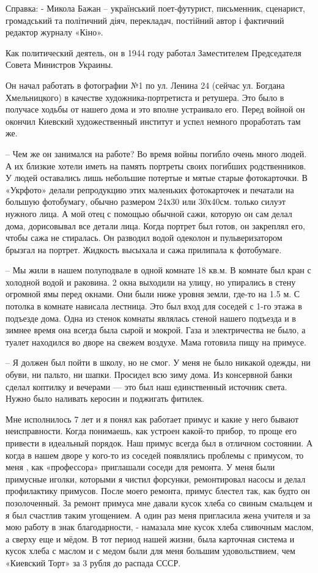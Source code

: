 Справка: - Микола Бажан – український поет-футурист, письменник, сценарист,
громадський та політичний діяч, перекладач, постійний автор і фактичний
редактор журналу «Кіно».

Как политический деятель, он в 1944 году  работал Заместителем Председателя
Совета Министров Украины.

 Он начал работать в фотографии №1 по ул. Ленина 24 (сейчас ул. Богдана
 Хмельницкого) в качестве художника-портретиста и ретушера. Это было в получасе
 ходьбы от нашего дома и это вполне  устраивало его. Перед войной он окончил
 Киевский художественный институт и успел немного проработать там же. 

– Чем же он занимался на работе? Во время войны погибло очень много людей. А их
близкие хотели иметь на память портреты своих погибших родственников. У людей
оставались лишь небольшие потертые и мятые старые фотокарточки.  В «Укрфото»
делали репродукцию этих маленьких фотокарточек и печатали на большую
фотобумагу, обычно размером 24х30 или 30х40см. только силуэт нужного лица. А
мой отец с помощью обычной сажи, которую он сам  делал дома, дорисовывал все
детали лица. Когда портрет был готов, он закреплял его, чтобы сажа не
стиралась. Он разводил водой одеколон и пульверизатором брызгал на портрет.
Жидкость высыхала и сажа прилипала к фотобумаге.

– Мы жили в нашем полуподвале в одной комнате 18 кв.м. В комнате был кран с
холодной водой и раковина. 2 окна выходили на улицу, но упирались в стену
огромной ямы перед окнами. Они были ниже уровня земли, где-то на 1.5 м. С
потолка в комнате нависала лестница. Это был вход для соседей с 1-го этажа в
подъезде дома. Одна из стенок комнаты являлась стеной нашего подъезда и в
зимнее время она всегда была сырой  и  мокрой.  Газа и  электричества не было,
а туалет находился во дворе на свежем воздухе. Мама готовила пищу на примусе.

– Я должен был пойти в школу, но не смог. У меня не было никакой одежды, ни
обуви, ни пальто, ни шапки. Просидел всю зиму дома. Из консервной банки  сделал
коптилку и  вечерами — это был наш единственный источник света.  Нужно было
наливать керосин и поджигать фитилек.

Мне исполнилось 7 лет и я понял как работает примус и какие у него бывают
неисправности. Когда понимаешь, как устроен какой-то прибор, то проще его
привести в идеальный порядок. Наш примус всегда был в отличном состоянии. А
когда в нашем дворе у кого-то из соседей появлялись проблемы с примусом, то
меня , как «профессора» приглашали соседи для ремонта. У меня были примусные
иголки, которыми я чистил форсунки, ремонтировал насосы и делал профилактику
примусов. После моего ремонта, примус блестел так, как будто он позолоченный.
За ремонт примуса мне давали кусок хлеба со свиным смальцем и я был счастлив
таким угощением. А один раз меня пригласила жена учителя и за мою работу в знак
благодарности, - намазала  мне кусок хлеба сливочным маслом, а сверху еще и
мёдом. В тот период нашей  жизни, была карточная система  и кусок хлеба с
маслом и с медом были для меня большим удовольствием, чем «Киевский Торт» за 3
рубля до распада СССР.

